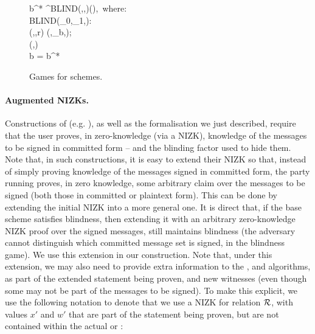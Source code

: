 \begin{figure}[ht!]
{\begin{minipage}[t]{0.43\textwidth}
{        %
        b^* \gets \adv^{BLIND(\cdot,\cdot,\cdot)}(\vk),~\textrm{where:} \\
        \pcind BLIND(\osmsg_0,\osmsg_1,\smsg): \\
        \pcind \pcind (\com,\pi,r) \gets \Blind(\vk,\osmsg_b,\smsg); \\
        \pcind \pcind \pcreturn (\com,\pi) \\
        \pcreturn b = b^*
      }
    \end{minipage}
  }
  \label{fig:sbcm-games}
  \caption{Games for \SBCM schemes.
  }
\end{figure}

\paragraph{Augmented NIZKs.} %
Constructions of \SBCM (e.g. \cite{asm06}), as well as the formalisation we just
described, require that the user proves, in zero-knowledge (via a NIZK),
knowledge of the messages to be signed in committed
form -- and the blinding factor used to hide them. Note that, in such
constructions, it is easy to extend their NIZK so that, instead of simply
proving knowledge of the messages signed in committed form, the party running
\SBCMBlind proves, in zero knowledge, some arbitrary claim over the messages to
be signed (both those in committed or plaintext form). This can be done by
extending the initial NIZK into a more general one. 
%
It is direct that, if the base \SBCM scheme satisfies blindness, then extending
it with an arbitrary zero-knowledge NIZK proof over the signed messages, still
maintains blindness (the adversary cannot distinguish which committed message
set is signed, in the blindness game).
%
We use this extension in our \CUASGen construction. Note that, under this
extension, we may also need to provide extra information to the \SBCMBlind,
\SBCMSign and \SBCMUnblind algorithms, as part of the extended statement being
proven, and new witnesses (even though some may not be part of the messages to
be signed). To make this explicit, we use the following notation to denote
that we use a NIZK for relation $\mathcal{R}$, with values $x'$ and $w'$ that are
part of the statement being proven, but are not contained within the actual
\smsg or \osmsg:

